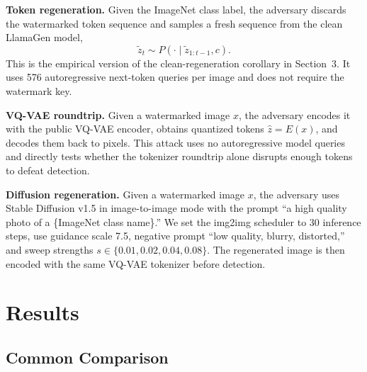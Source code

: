 \documentclass[12pt]{article}
\begin{document}
\begin{table}[H]
\centering
{}
\caption{Attack access model for the three removal strategies. AR
queries count calls to the LlamaGen autoregressive sampler per image.}
\label{tab:attack_access}
\end{table}

\textbf{Token regeneration.} Given the ImageNet class label, the
adversary discards the watermarked token sequence and samples a fresh
sequence from the clean LlamaGen model,
\[
\tilde z_t\sim P(\cdot\mid \tilde z_{1:t-1},c).
\]
This is the empirical version of the clean-regeneration corollary in
Section~3. It uses 576 autoregressive next-token queries per image and
does not require the watermark key.

\textbf{VQ-VAE roundtrip.} Given a watermarked image $x$, the adversary
encodes it with the public VQ-VAE encoder, obtains quantized tokens
$\hat z=E(x)$, and decodes them back to pixels. This attack uses no
autoregressive model queries and directly tests whether the tokenizer
roundtrip alone disrupts enough tokens to defeat detection.

\textbf{Diffusion regeneration.} Given a watermarked image $x$, the
adversary uses Stable Diffusion v1.5 in image-to-image mode with the
prompt ``a high quality photo of a \{ImageNet class name\}.'' We set
the img2img scheduler to 30 inference steps, use guidance scale 7.5,
negative prompt ``low quality, blurry, distorted,'' and sweep strengths
$s\in\{0.01,0.02,0.04,0.08\}$. The regenerated image is then encoded
with the same VQ-VAE tokenizer before detection.

\section{Results}

\subsection{Common Comparison}
\end{document}
